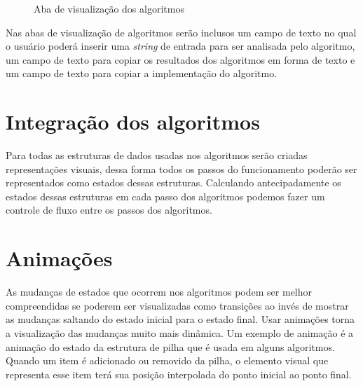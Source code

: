 \begin{figure}[ht]
    \centering
    \captionsetup{width=16cm}
    \caption{Aba de visualização dos algoritmos}
    \label{fig:mfirst}
\end{figure}
\FloatBarrier

Nas abas de visualização de algoritmos serão inclusos um campo de texto no qual o usuário poderá inserir uma \textit{string} de entrada para ser analisada pelo algoritmo, um campo de texto para copiar os resultados dos algoritmos em forma de texto e um campo de texto para copiar a implementação do algoritmo.

\section{Integração dos algoritmos}
Para todas as estruturas de dados usadas nos algoritmos serão criadas representações visuais, dessa forma todos os passos do funcionamento poderão ser representados como estados dessas estruturas. Calculando antecipadamente os estados dessas estruturas em cada passo dos algoritmos podemos fazer um controle de fluxo entre os passos dos algoritmos.

\section{Animações}
As mudanças de estados que ocorrem nos algoritmos podem ser melhor compreendidas se poderem ser visualizadas como transições ao invés de mostrar as mudanças saltando do estado inicial para o estado final. Usar animações torna a visualização das mudanças muito mais dinâmica. Um exemplo de animação é a animação do estado da estrutura de pilha que é usada em alguns algoritmos. Quando um item é adicionado ou removido da pilha, o elemento visual que representa esse item terá sua posição interpolada do ponto inicial ao ponto final.

